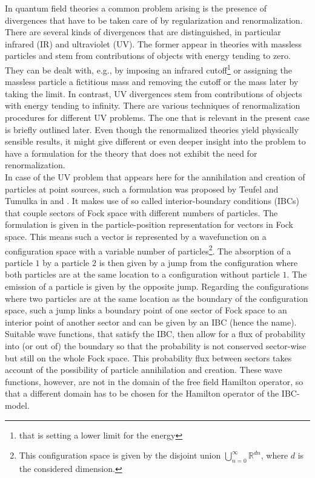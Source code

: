 In quantum field theories a common problem arising is the presence of divergences that have to be taken care of by regularization and renormalization. There are several kinds of divergences that are distinguished, in particular infrared (IR) and ultraviolet (UV). The former appear in theories with massless particles and stem from contributions of objects with energy tending to zero. They can be dealt with, e.g., by imposing an infrared cutoff\footnote{that is setting a lower limit for the energy} or assigning the massless particle a fictitious mass and removing the cutoff or the mass later by taking the limit. In contrast, UV divergences stem from contributions of objects with energy tending to infinity. There are various techniques of renormalization procedures for different UV problems. The one that is relevant in the present case is briefly outlined later. Even though the renormalized theories yield physically sensible results, it might give different or even deeper insight into the problem to have a formulation for the theory that does not exhibit the need for renormalization.
\\
In case of the UV problem that appears here for the annihilation and creation of particles at point sources, such a formulation was proposed by Teufel and Tumulka in \cite{56e26bd5} and \cite{f5e1d34b}. It makes use of so called interior-boundary conditions (IBCs) that couple sectors of Fock space with different numbers of particles. The formulation is given in the particle-position representation for vectors in Fock space. This means such a vector is represented by a wavefunction on a configuration space with a variable number of particles\footnote{This configuration space is given by the disjoint union $\bigcup_{n = 0}^{\infty}\mathbb{R}^{dn}$, where $d$ is the considered dimension.}. The absorption of a particle $1$ by a particle $2$ is then given by a jump from the configuration where both particles are at the same location to a configuration without particle $1$. The emission of a particle is given by the opposite jump. Regarding the configurations where two particles are at the same location as the boundary of the configuration space, such a jump links a boundary point of one sector of Fock space to an interior point of another sector and can be given by an IBC (hence the name). Suitable wave functions, that satisfy the IBC, then allow for a flux of probability into (or out of) the boundary so that the probability is not conserved sector-wise but still on the whole Fock space. This probability flux between sectors takes account of the possibility of particle annihilation and creation. These wave functions, however, are not in the domain of the free field Hamilton operator, so that a different domain has to be chosen for the Hamilton operator of the IBC-model.
